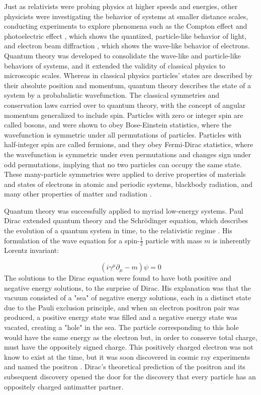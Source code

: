 \indent Just as relativists were probing physics at higher speeds and energies, other physicists were investigating the behavior of systems at smaller distance scales, conducting experiments to explore phenomena such as the Compton effect \cite{PhysRev.21.483} and photoelectric effect \cite{Einstein:1905cc}, which shows the quantized, particle-like behavior of light, and electron beam diffraction \cite{Davisson:1927ta}, which shows the wave-like behavior of electrons. Quantum theory was developed to consolidate the wave-like and particle-like behaviors of systems, and it extended the validity of classical physics to microscopic scales. Whereas in classical physics particles' states are described by their absolute position and momentum, quantum theory describes the state of a system by a probabalistic wavefunction. The classical symmetries and conservation laws carried over to quantum theory, with the concept of angular momentum generalized to include spin. Particles with zero or integer spin are called bosons, and were shown to obey Bose-Einstein statistics, where the wavefunction is symmetric under all permutations of particles. Particles with half-integer spin are called fermions, and they obey Fermi-Dirac statistics, where the wavefunction is symmetric under even permutations and changes sign under odd permutations, implying that no two particles can occupy the same state. These many-particle symmetries were applied to derive properties of materials and states of electrons in atomic and periodic systems, blackbody radiation, and many other properties of matter and radiation \cite{Shankar}.

\indent Quantum theory was successfully applied to myriad low-energy systems. Paul Dirac extended quantum theory and the Schr\"odinger equation, which describes the evolution of a quantum system in time, to the relativistic regime \cite{Diracqm}. His formulation of the wave equation for a spin-$\frac{1}{2}$ particle with mass $m$ is inherently Lorentz invariant:

\begin{equation}
(i \gamma^\mu \partial_\mu - m)\psi = 0
\end{equation}
The solutions to the Dirac equation were found to have both positive and negative energy solutions, to the surprise of Dirac. His explanation was that the vacuum consisted of a "sea" of negative energy solutions, each in a distinct state due to the Pauli exclusion principle, and when an electron positron pair was produced, a positive energy state was filled and a negative energy state was vacated, creating a "hole" in the sea. The particle corresponding to this hole would have the same energy as the electron but, in order to conserve total charge, must have the oppositely signed charge. This positively charged electron was not know to exist at the time, but it was soon discovered in cosmic ray experiments and named the positron \cite{PhysRev.43.491}. Dirac's theoretical prediction of the positron and its subsequent discovery opened the door for the discovery that every particle has an oppositely charged antimatter partner. 

